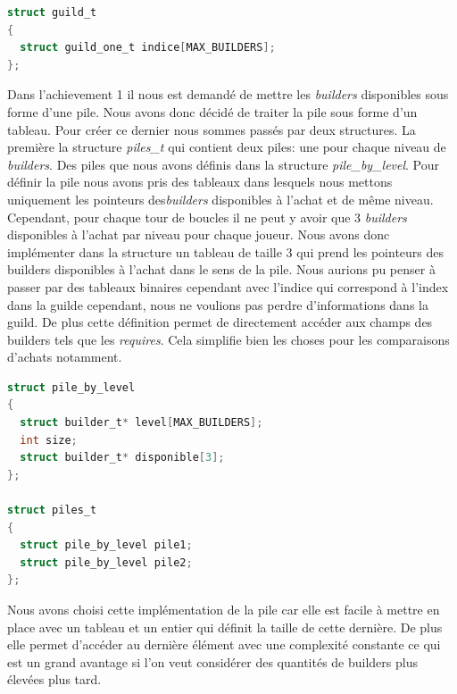 \documentclass{article}
\begin{document}
\begin{tcolorbox}[colback=gray!10,colframe=white!75!black]

\begin{lstlisting}[language=C, caption={La structure \texttt{guild\_t}}, label={lst:exemple4-c}]
struct guild_t 
{
  struct guild_one_t indice[MAX_BUILDERS];
};
\end{lstlisting}
\end{tcolorbox}
\vspace{1em}
\hspace{1em} Dans l'achievement 1 il nous est demandé de mettre les \emph{builders} disponibles sous forme d'une pile. Nous avons donc décidé de traiter la pile sous forme d'un tableau. Pour créer ce dernier nous sommes passés par deux structures. La première la structure \emph{piles\_t} qui contient deux piles: une pour chaque niveau de \emph{builders}. Des piles que nous avons définis dans la structure \emph{pile\_by\_level}. Pour définir la pile nous avons pris des tableaux dans lesquels nous mettons uniquement les  pointeurs des\emph{builders} disponibles à l'achat et de même niveau. Cependant, pour chaque tour de boucles il ne peut y avoir que 3 \emph{builders} disponibles à l'achat par niveau pour chaque joueur. Nous avons donc implémenter dans la structure un tableau de taille 3 qui prend les pointeurs des builders disponibles à l'achat dans le sens de la pile. Nous aurions pu penser à passer par des tableaux binaires cependant avec l'indice qui correspond à l'index dans la guilde cependant, nous ne voulions pas perdre d'informations dans la guild. De plus cette définition permet de directement accéder aux champs des builders tels que les \emph{ requires}. Cela simplifie bien les choses pour les comparaisons d'achats notamment.


\begin{tcolorbox}[colback=gray!10,colframe=white!75!black]
\begin{lstlisting}[language=C, caption={la structures piles\_t}, label={lst:exemple5-c}]
struct pile_by_level
{
  struct builder_t* level[MAX_BUILDERS];
  int size;
  struct builder_t* disponible[3]; 
};

struct piles_t 
{
  struct pile_by_level pile1;
  struct pile_by_level pile2;
};
\end{lstlisting}
\end{tcolorbox}

Nous avons choisi cette implémentation de la pile car elle est facile à mettre en place avec un tableau et un entier qui définit la taille de cette dernière. De plus elle permet d'accéder au dernière élément avec une complexité constante ce qui est un grand avantage si l'on veut considérer des quantités de builders plus élevées plus tard. 
\end{document}
